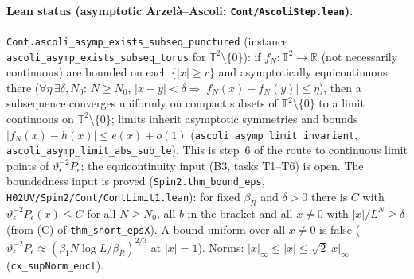 \documentclass[11pt]{amsart}
\theoremstyle{definition}
\theoremstyle{remark}
\numberwithin{equation}{section}
\newcommand{\R}{\mathbb{R}}
\begin{document}
\paragraph{Lean status (asymptotic Arzel\`a--Ascoli; \texttt{Cont/AscoliStep.lean}).}
\texttt{Cont.ascoli\_asymp\_exists\_subseq\_punctured} (instance
\texttt{ascoli\_asymp\_exists\_subseq\_torus} for $\mathbb T^2\setminus\{0\}$): if $f_N:\mathbb T^2\to\R$
(not necessarily continuous) are bounded on each $\{|x|\ge r\}$ and asymptotically equicontinuous there
($\forall\eta\,\exists\delta,N_0$: $N\ge N_0$, $|x-y|<\delta\Rightarrow|f_N(x)-f_N(y)|\le\eta$), then a
subsequence converges uniformly on compact subsets of $\mathbb T^2\setminus\{0\}$ to a limit continuous
on $\mathbb T^2\setminus\{0\}$; limits inherit asymptotic symmetries and bounds
$|f_N(x)-h(x)|\le e(x)+o(1)$ (\texttt{ascoli\_asymp\_limit\_invariant},
\texttt{ascoli\_asymp\_limit\_abs\_sub\_le}). This is step~6 of the route to continuous limit points
of $\vartheta_\epsilon^{-2}P_\epsilon$; the equicontinuity input (B3, tasks T1--T6) is open.
The boundedness input is proved (\texttt{Spin2.thm\_bound\_eps}, \texttt{H02UV/Spin2/Cont/ContLimit1.lean}): for fixed $\beta_R$ and
$\delta>0$ there is $C$ with $\vartheta_\epsilon^{-2}P_\epsilon(x)\le C$ for all $N\ge N_0$, all $b$ in the bracket and all
$x\ne0$ with $|x|/L^N\ge\delta$ (from (C) of \texttt{thm\_short\_epsX}). A bound uniform over all $x\ne0$ is false
($\vartheta_\epsilon^{-2}P_\epsilon\approx(\beta_1N\log L/\beta_R)^{2/3}$ at $|x|=1$). Norms:
$|x|_\infty\le|x|\le\sqrt2|x|_\infty$ (\texttt{cx\_supNorm\_eucl}).
\end{document}
